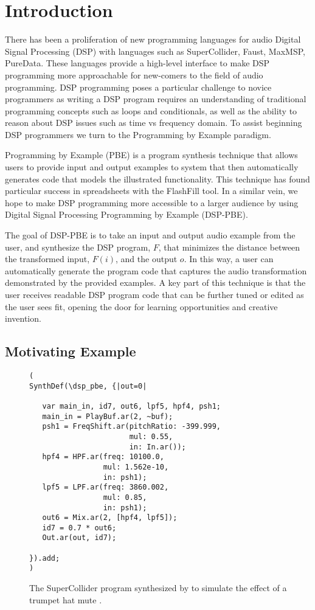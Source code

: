 
\section{Introduction}

There has been a proliferation of new programming languages for audio Digital Signal Processing (DSP) with languages such as SuperCollider, Faust, MaxMSP, PureData.
These languages provide a high-level interface to make DSP programming more approachable for new-comers to the field of audio programming.
DSP programming poses a particular challenge to novice programmers as writing a DSP program requires an understanding of traditional programming concepts such as loops and conditionals, as well as the ability to reason about DSP issues such as time vs frequency domain.
To assist beginning DSP programmers we turn to the Programming by Example paradigm.

Programming by Example (PBE) is a program synthesis technique that allows users to provide input and output examples to system that then automatically generates code that models the illustrated functionality.
This technique has found particular success in spreadsheets with the FlashFill tool.
In a similar vein, we hope to make DSP programming more accessible to a larger audience by using Digital Signal Processing Programming by Example (DSP-PBE).

The goal of DSP-PBE is to take an input and output audio example from the user, and synthesize the DSP program, $F$, that minimizes the distance between the transformed input, $F(i)$, and the output $o$.
In this way, a user can automatically generate the program code that captures the audio transformation demonstrated by the provided examples.
A key part of this technique is that the user receives readable DSP program code that can be further tuned or edited as the user sees fit, opening the door for learning opportunities and creative invention.


\subsection{Motivating Example}


\begin{figure}
\begin{lstlisting}
( 
SynthDef(\dsp_pbe, {|out=0|

   var main_in, id7, out6, lpf5, hpf4, psh1;
   main_in = PlayBuf.ar(2, ~buf);
   psh1 = FreqShift.ar(pitchRatio: -399.999, 
                       mul: 0.55, 
                       in: In.ar());
   hpf4 = HPF.ar(freq: 10100.0, 
                 mul: 1.562e-10, 
                 in: psh1);
   lpf5 = LPF.ar(freq: 3860.002, 
                 mul: 0.85, 
                 in: psh1);
   out6 = Mix.ar(2, [hpf4, lpf5]);
   id7 = 0.7 * out6;
   Out.ar(out, id7);

}).add;
)
\end{lstlisting}
\caption{The SuperCollider program synthesized by \ourTool to simulate the effect of a trumpet hat mute .}
\label{fig:sc_code}
\end{figure}

